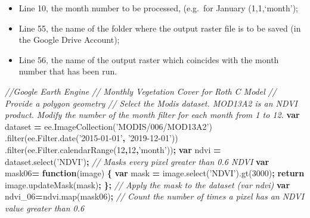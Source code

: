 \documentclass[
  10pt,
  b5paper,
]{book}
\newenvironment{Shaded}{\begin{snugshade}}{\end{snugshade}}
\newcommand{\AttributeTok}[1]{\textcolor[rgb]{0.77,0.63,0.00}{#1}}
\newcommand{\CommentTok}[1]{\textcolor[rgb]{0.56,0.35,0.01}{\textit{#1}}}
\newcommand{\ControlFlowTok}[1]{\textcolor[rgb]{0.13,0.29,0.53}{\textbf{#1}}}
\newcommand{\DecValTok}[1]{\textcolor[rgb]{0.00,0.00,0.81}{#1}}
\newcommand{\KeywordTok}[1]{\textcolor[rgb]{0.13,0.29,0.53}{\textbf{#1}}}
\newcommand{\NormalTok}[1]{#1}
\newcommand{\OperatorTok}[1]{\textcolor[rgb]{0.81,0.36,0.00}{\textbf{#1}}}
\newcommand{\StringTok}[1]{\textcolor[rgb]{0.31,0.60,0.02}{#1}}
\newcommand{\VariableTok}[1]{\textcolor[rgb]{0.00,0.00,0.00}{#1}}
\providecommand{\tightlist}{%
  \setlength{\itemsep}{0pt}\setlength{\parskip}{0pt}}
\begin{document}
\begin{itemize}
\tightlist
\item
  Line 10, the month number to be processed, (e.g.~for January (1,1,`month');
\item
  Line 55, the name of the folder where the output raster file is to be saved (in the Google Drive Account);
\item
  Line 56, the name of the output raster which coincides with the month number that has been run.
\end{itemize}

\begin{Shaded}
\begin{Highlighting}[]
\CommentTok{//Google Earth Engine }
\CommentTok{// Monthly Vegetation Cover for Roth C Model   }
 \CommentTok{// Provide a polygon geometry}
 \CommentTok{// Select the Modis dataset. MOD13A2 is an NDVI product. Modify the number of the month filter for each month from 1 to 12. }
 \KeywordTok{var}\NormalTok{ dataset }\OperatorTok{=} \VariableTok{ee}\NormalTok{.}\AttributeTok{ImageCollection}\NormalTok{(}\StringTok{'MODIS/006/MOD13A2'}\NormalTok{)}
\NormalTok{                  .}\AttributeTok{filter}\NormalTok{(}\VariableTok{ee}\NormalTok{.}\VariableTok{Filter}\NormalTok{.}\AttributeTok{date}\NormalTok{(}\StringTok{'2015-01-01'}\OperatorTok{,} \StringTok{'2019-12-01'}\NormalTok{))}
\NormalTok{                  .}\AttributeTok{filter}\NormalTok{(}\VariableTok{ee}\NormalTok{.}\VariableTok{Filter}\NormalTok{.}\AttributeTok{calendarRange}\NormalTok{(}\DecValTok{12}\OperatorTok{,}\DecValTok{12}\OperatorTok{,}\StringTok{'month'}\NormalTok{))}\OperatorTok{;}
 \KeywordTok{var}\NormalTok{ ndvi }\OperatorTok{=} \VariableTok{dataset}\NormalTok{.}\AttributeTok{select}\NormalTok{(}\StringTok{'NDVI'}\NormalTok{)}\OperatorTok{;}
 \CommentTok{// Masks every pixel greater than 0.6 NDVI}
\KeywordTok{var}\NormalTok{ mask06}\OperatorTok{=} \KeywordTok{function}\NormalTok{(image) }\OperatorTok{\{}
    \KeywordTok{var}\NormalTok{ mask }\OperatorTok{=} \VariableTok{image}\NormalTok{.}\AttributeTok{select}\NormalTok{(}\StringTok{'NDVI'}\NormalTok{).}\AttributeTok{gt}\NormalTok{(}\DecValTok{3000}\NormalTok{)}\OperatorTok{;}
    \ControlFlowTok{return} \VariableTok{image}\NormalTok{.}\AttributeTok{updateMask}\NormalTok{(mask)}\OperatorTok{;}
  \OperatorTok{\};}
 \CommentTok{// Apply the mask to the dataset (var ndvi)}
\KeywordTok{var}\NormalTok{ ndvi_06}\OperatorTok{=}\VariableTok{ndvi}\NormalTok{.}\AttributeTok{map}\NormalTok{(mask06)}\OperatorTok{;} 
 \CommentTok{// Count the number of times a pixel has an NDVI value greater than 0.6}

\end{Highlighting}
\end{Shaded}
\end{document}
